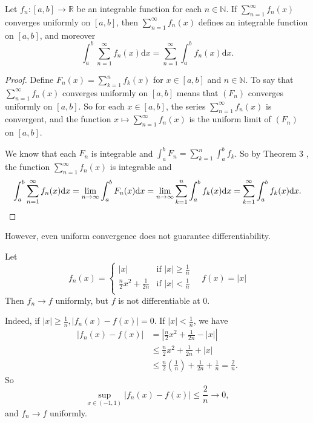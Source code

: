 \documentclass[a4paper]{article}
\begin{document}
\begin{corollary}\label{col:4}
    Let $f_{n}:[a, b] \rightarrow \mathbb{R}$ be an integrable function for each $n \in \mathbb{N}$. If $\sum_{n=1}^{\infty} f_{n}(x)$ converges uniformly on $[a, b]$, then $\sum_{n=1}^{\infty} f_{n}(x)$ defines an integrable function on $[a, b]$, and moreover
    \[
    \int_{a}^{b} \sum_{n=1}^{\infty} f_{n}(x) \mathrm{d} x=\sum_{n=1}^{\infty} \int_{a}^{b} f_{n}(x) \mathrm{d} x.
    \]
\end{corollary}
\begin{proof}
    Define $F_{n}(x)=\sum_{k=1}^{n} f_{k}(x)$ for $x \in[a, b]$ and $n \in \mathbb{N}$. To say that $\sum_{n=1}^{\infty} f_{n}(x)$ converges uniformly on $[a, b]$ means that $\left(F_{n}\right)$ converges uniformly on $[a, b]$. So for each $x \in[a, b]$, the series $\sum_{n=1}^{\infty} f_{n}(x)$ is convergent, and the function $x \mapsto \sum_{n=1}^{\infty} f_{n}(x)$ is the uniform limit of $\left(F_{n}\right)$ on $[a, b]$.

    We know that each $F_{n}$ is integrable and $\int_{a}^{b} F_{n}=\sum_{k=1}^{n} \int_{a}^{b} f_{k}$. So by Theorem 3 , the function $\sum_{n=1}^{\infty} f_{n}(x)$ is integrable and
    \[
    \int_{a}^{b} \sum_{n=1}^{\infty} f_{n}(x) \mathrm{d} x=\lim _{n \rightarrow \infty} \int_{a}^{b} F_{n}(x) \mathrm{d} x=\lim _{n \rightarrow \infty} \sum_{k=1}^{n} \int_{a}^{b} f_{k}(x) \mathrm{d} x=\sum_{k=1}^{\infty} \int_{a}^{b} f_{k}(x) \mathrm{d} x.\qedhere
    \]
\end{proof}

However, even uniform convergence does not guarantee differentiability. 
\begin{example}
    Let 
    \[
        f_n(x) = \begin{cases}
        |x| &\text{if }|x|\ge \frac{1}{n}\\
        \frac{n}{2}x^2+\frac{1}{2n} &\text{if }|x|<\frac{1}{n}\\
        \end{cases} \quad f(x) = |x|
    \]
    Then $ f_n\to f $ uniformly, but $f$ is not differentiable at $0$. 

    Indeed, if $ |x|\ge \frac{1}{n}, |f_n(x)-f(x)|=0 $. If $ |x|<\frac{1}{n} $, we have 
    \begin{align*}
        |f_n(x)-f(x)| &= \left| \frac{n}{2}x^2+\frac{1}{2n}-|x| \right| \\ 
        &\le \frac{n}{2}x^2+\frac{1}{2n} +|x| \\ 
        &\le \frac{n}{2}\left( \frac{1}{n} \right) +\frac{1}{2n}+\frac{1}{n}
        =\frac{2}{n}. 
    \end{align*}
    So 
    \[
        \sup_{x\in (-1,1)}|f_n(x)-f(x)| \le \frac{2}{n}\to 0, 
    \]
    and $f_n\to f$ uniformly. 
\end{example}
\end{document}
